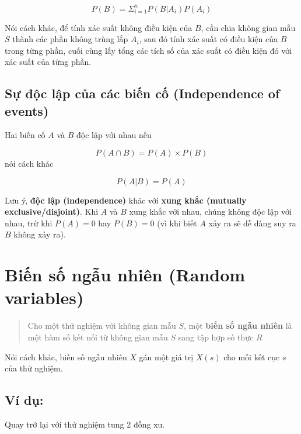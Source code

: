 \documentclass[
]{book}
\begin{document}
\[
P(B) = \Sigma^n_{i = 1}P(B|A_i)P(A_i)
\]

Nói cách khác, để tính xác suất không điều kiện của \(B\), cần chia không gian mẫu \(S\) thành các phần không trùng lắp \(A_i\), sau đó tính xác suất có điều kiện của \(B\) trong từng phần, cuối cùng lấy tổng các tích số của xác suất có điều kiện đó với xác suất của từng phần.

\hypertarget{sux1ef1-ux111ux1ed9c-lux1eadp-cux1ee7a-cuxe1c-biux1ebfn-cux1ed1-independence-of-events}{%
\subsection{Sự độc lập của các biến cố (Independence of events)}\label{sux1ef1-ux111ux1ed9c-lux1eadp-cux1ee7a-cuxe1c-biux1ebfn-cux1ed1-independence-of-events}}

Hai biến cố \(A\) và \(B\) độc lập với nhau nếu

\[
P(A \cap B) = P(A) \times P(B)
\]
nói cách khác

\[
P(A|B) = P(A)
\]

Lưu ý, \textbf{độc lập (independence)} khác với \textbf{xung khắc (mutually exclusive/disjoint)}. Khi \(A\) và \(B\) xung khắc với nhau, chúng không độc lập với nhau, trừ khi \(P(A) = 0\) hay \(P(B) = 0\) (vì khi biết \(A\) xảy ra sẽ dễ dàng suy ra \(B\) không xảy ra).

\hypertarget{biux1ebfn-sux1ed1-ngux1eabu-nhiuxean-random-variables}{%
\section{Biến số ngẫu nhiên (Random variables)}\label{biux1ebfn-sux1ed1-ngux1eabu-nhiuxean-random-variables}}

\begin{quote}
Cho một thử nghiệm với không gian mẫu \(S\), một \textbf{biến số ngẫu nhiên} là một hàm số kết nối từ không gian mẫu \(S\) sang tập hợp số thực \(R\)
\end{quote}

Nói cách khác, biến số ngẫu nhiên \(X\) gán một giá trị \(X(s)\) cho mỗi kết cục \(s\) của thử nghiệm.

\hypertarget{vuxed-dux1ee5}{%
\subsection{Ví dụ:}\label{vuxed-dux1ee5}}

Quay trở lại với thử nghiệm tung 2 đồng xu.
\end{document}
